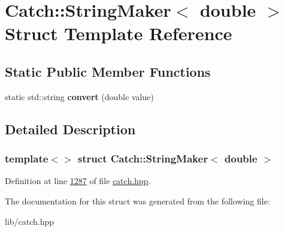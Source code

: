 \hypertarget{structCatch_1_1StringMaker_3_01double_01_4}{}\section{Catch\+::String\+Maker$<$ double $>$ Struct Template Reference}
\label{structCatch_1_1StringMaker_3_01double_01_4}
\subsection*{Static Public Member Functions}
\begin{DoxyCompactItemize}
\item 
\mbox{\label{structCatch_1_1StringMaker_3_01double_01_4_acaa61529acad2462292c747d34e5f3d2}} 
static std\+::string {\bfseries convert} (double value)
\end{DoxyCompactItemize}


\subsection{Detailed Description}
\subsubsection*{template$<$$>$\newline
struct Catch\+::\+String\+Maker$<$ double $>$}



Definition at line \mbox{\hyperlink{catch_8hpp_source_l01287}{1287}} of file \mbox{\hyperlink{catch_8hpp_source}{catch.\+hpp}}.



The documentation for this struct was generated from the following file\+:\begin{DoxyCompactItemize}
\item 
lib/catch.\+hpp\end{DoxyCompactItemize}
